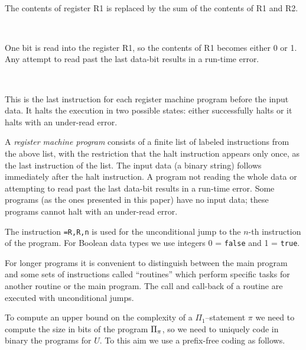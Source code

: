 \documentclass[
aip,
cha,
amssymb
]{revtex4-1}
\newenvironment{Instruction}[2]%
{
\noindent {\bf #1 \hfill #2} \\[-2ex]
\begin{flushright}\begin{minipage}{\textwidth}
   }%
{\end{minipage}
\end{flushright}}
\begin{document}
\begin{Instruction}{~+R1,R2}{       }%
The contents of register R1 is replaced by the sum of the contents of
 R1 and R2.
\end{Instruction}

\bigskip

\begin{Instruction}{~!R1}{         }%
One bit is read into the  register R1, so the contents of R1
becomes either 0 or 1.  Any attempt to read past the last data-bit
results in a run-time error.
\end{Instruction}

\bigskip

\begin{Instruction}{~\%}{          }%
   This is the last instruction for each register machine
program before the input data. It halts the execution in two
possible states: either successfully halts or it halts with an under-read error.
\end{Instruction}




A {\em register machine program}\/ consists of a finite list of
labeled instructions from the above list, with the restriction that
the halt instruction appears only once, as the last instruction
of the list. The input data (a binary string) follows immediately
after the halt instruction.  A program not reading the whole
data or attempting to read past the last data-bit results in a
run-time error. Some programs (as the ones presented in this paper)
have no input data; these programs cannot halt with an under-read error.



The instruction {\tt =R,R,n} is used for the unconditional jump to the   $n$-th instruction
of the program.
For Boolean data types we use integers 0 = \verb|false| and 1 = \verb|true|.

For longer programs it is convenient to  distinguish
between the main program and some sets of instructions called ``routines'' which
perform specific tasks for another routine or the main program.  The call and call-back of a routine are executed with  unconditional jumps.

To compute an upper bound on the complexity of a $\Pi_{1}$--statement $\pi$ we need to compute the size in bits of the program  $\Pi_{\rm \pi}$,
so we need to uniquely code in binary the programs for $U$. To this aim we use a prefix-free coding as follows.
\end{document}
